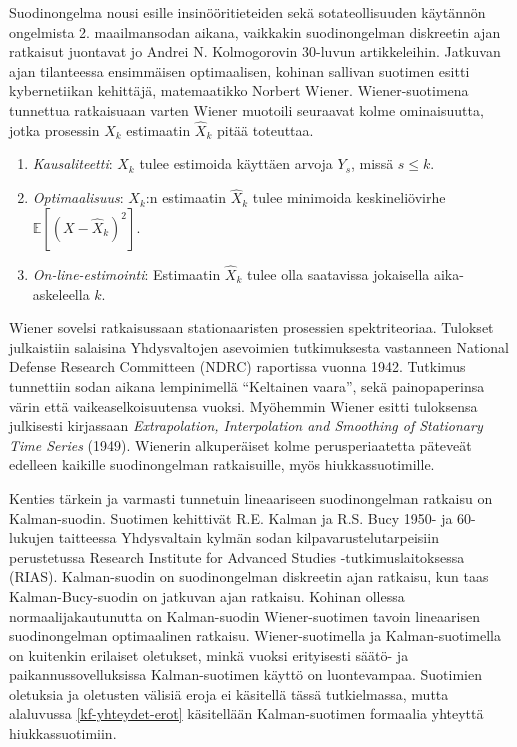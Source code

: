 \documentclass[
  12pt,
  a4paper, twoside]{book}
\begin{document}
Suodinongelma nousi esille insinööritieteiden sekä sotateollisuuden käytännön ongelmista 2. maailmansodan aikana, vaikkakin suodinongelman diskreetin ajan ratkaisut juontavat jo Andrei N. Kolmogorovin 30-luvun artikkeleihin. Jatkuvan ajan tilanteessa ensimmäisen optimaalisen, kohinan sallivan suotimen esitti kybernetiikan kehittäjä, matemaatikko Norbert Wiener. Wiener-suotimena tunnettua ratkaisuaan varten Wiener muotoili seuraavat kolme ominaisuutta, jotka prosessin \(X_k\) estimaatin \(\hat{X}_k\) pitää toteuttaa.

\begin{enumerate}
\vspace{\baselineskip}
\item \textit{Kausaliteetti}: $X_k$ tulee estimoida käyttäen arvoja $Y_s$, missä $s \leq k$.
\item \textit{Optimaalisuus}: $X_k$:n estimaatin $\hat{X}_k$ tulee minimoida keskineliövirhe $\mathbb{E}[(X-\hat{X}_k)^2]$.
\item \textit{On-line-estimointi}: Estimaatin $\hat{X}_k$ tulee olla saatavissa jokaisella aika-askeleella $k$. 
\vspace{\baselineskip}
\end{enumerate}

Wiener sovelsi ratkaisussaan stationaaristen prosessien spektriteoriaa. Tulokset julkaistiin salaisina Yhdysvaltojen asevoimien tutkimuksesta vastanneen National Defense Research Committeen (NDRC) raportissa vuonna 1942. Tutkimus tunnettiin sodan aikana lempinimellä ``Keltainen vaara'', sekä painopaperinsa värin että vaikeaselkoisuutensa vuoksi. Myöhemmin Wiener esitti tuloksensa julkisesti kirjassaan \textit{Extrapolation, Interpolation and Smoothing of Stationary Time Series} (1949). Wienerin alkuperäiset kolme perusperiaatetta päteveät edelleen kaikille suodinongelman ratkaisuille, myös hiukkassuotimille.

Kenties tärkein ja varmasti tunnetuin lineaariseen suodinongelman ratkaisu on Kalman-suodin. Suotimen kehittivät R.E. Kalman ja R.S. Bucy 1950- ja 60-lukujen taitteessa Yhdysvaltain kylmän sodan kilpavarustelutarpeisiin perustetussa Research Institute for Advanced Studies -tutkimuslaitoksessa (RIAS). Kalman-suodin on suodinongelman diskreetin ajan ratkaisu, kun taas Kalman-Bucy-suodin on jatkuvan ajan ratkaisu. Kohinan ollessa normaalijakautunutta on Kalman-suodin Wiener-suotimen tavoin lineaarisen suodinongelman optimaalinen ratkaisu. Wiener-suotimella ja Kalman-suotimella on kuitenkin erilaiset oletukset, minkä vuoksi erityisesti säätö- ja paikannussovelluksissa Kalman-suotimen käyttö on luontevampaa. Suotimien oletuksia ja oletusten välisiä eroja ei käsitellä tässä tutkielmassa, mutta alaluvussa \ref{kf-yhteydet-erot} käsitellään Kalman-suotimen formaalia yhteyttä hiukkassuotimiin.
\end{document}
